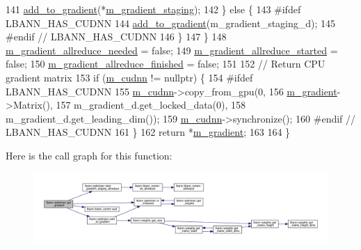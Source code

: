 \begin{DoxyCode}
141       \hyperlink{classlbann_1_1optimizer_a435d31e3b7a0302e36439ee36f62dba8}{add\_to\_gradient}(*\hyperlink{classlbann_1_1optimizer_a92cd058d4f9fc8162d36d52461a96df2}{m\_gradient\_staging});
142     \} \textcolor{keywordflow}{else} \{
143 \textcolor{preprocessor}{      #ifdef LBANN\_HAS\_CUDNN}
144       \hyperlink{classlbann_1_1optimizer_a435d31e3b7a0302e36439ee36f62dba8}{add\_to\_gradient}(m\_gradient\_staging\_d);
145 \textcolor{preprocessor}{      #endif // LBANN\_HAS\_CUDNN}
146     \}
147   \}
148   \hyperlink{classlbann_1_1optimizer_a2dc18dcc3cf9510947304c3c5d059eb0}{m\_gradient\_allreduce\_needed} = \textcolor{keyword}{false};
149   \hyperlink{classlbann_1_1optimizer_ac77740a916f397600efae0c03bc5a045}{m\_gradient\_allreduce\_started} = \textcolor{keyword}{false};
150   \hyperlink{classlbann_1_1optimizer_a4d332551d05e245ad3f862653b5af65a}{m\_gradient\_allreduce\_finished} = \textcolor{keyword}{false};
151 
152   \textcolor{comment}{// Return CPU gradient matrix}
153   \textcolor{keywordflow}{if} (\hyperlink{classlbann_1_1optimizer_a2f24dbeaca18b06f4aa7d179bbf96680}{m\_cudnn} != \textcolor{keyword}{nullptr}) \{
154 \textcolor{preprocessor}{    #ifdef LBANN\_HAS\_CUDNN}
155     \hyperlink{classlbann_1_1optimizer_a2f24dbeaca18b06f4aa7d179bbf96680}{m\_cudnn}->copy\_from\_gpu(0,
156                            \hyperlink{classlbann_1_1optimizer_a3df20cb0ae2b60430ad4fd235d66c12e}{m\_gradient}->Matrix(),
157                            m\_gradient\_d.get\_locked\_data(0),
158                            m\_gradient\_d.get\_leading\_dim());
159     \hyperlink{classlbann_1_1optimizer_a2f24dbeaca18b06f4aa7d179bbf96680}{m\_cudnn}->synchronize();
160 \textcolor{preprocessor}{    #endif // LBANN\_HAS\_CUDNN}
161   \}
162   \textcolor{keywordflow}{return} *\hyperlink{classlbann_1_1optimizer_a3df20cb0ae2b60430ad4fd235d66c12e}{m\_gradient};
163 
164 \}
\end{DoxyCode}
Here is the call graph for this function\+:\nopagebreak
\begin{figure}[H]
\begin{center}
\leavevmode
\includegraphics[width=350pt]{classlbann_1_1optimizer_a12b7dbc72eb2de78d6ad798b8939f349_cgraph}
\end{center}
\end{figure}
